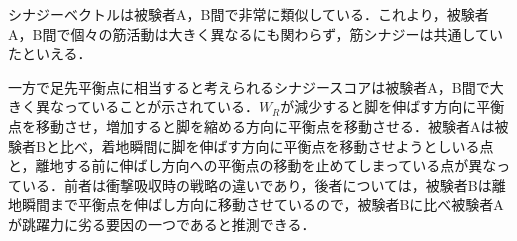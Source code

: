 \newpage

シナジーベクトルは被験者A，B間で非常に類似している．これより，被験者A，B間で個々の筋活動は大きく異なるにも関わらず，筋シナジーは共通していたといえる．

一方で足先平衡点に相当すると考えられるシナジースコアは被験者A，B間で大きく異なっていることが示されている．$W_R$が減少すると脚を伸ばす方向に平衡点を移動させ，増加すると脚を縮める方向に平衡点を移動させる．被験者Aは被験者Bと比べ，着地瞬間に脚を伸ばす方向に平衡点を移動させようとしいる点と，離地する前に伸ばし方向への平衡点の移動を止めてしまっている点が異なっている．前者は衝撃吸収時の戦略の違いであり，後者については，被験者Bは離地瞬間まで平衡点を伸ばし方向に移動させているので，被験者Bに比べ被験者Aが跳躍力に劣る要因の一つであると推測できる．


 